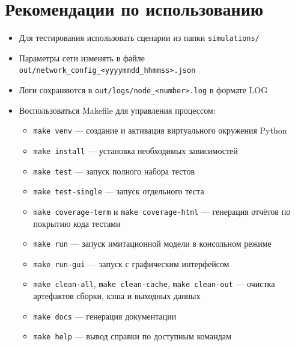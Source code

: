 \section{Рекомендации по использованию}

\begin{itemize}
    \item Для тестирования использовать сценарии из папки \texttt{simulations/}
    \item Параметры сети изменять в файле \verb|out/network_config_<yyyymmdd_hhmmss>.json|
    \item Логи сохраняются в \verb|out/logs/node_<number>.log| в формате LOG
    \item Воспользоваться Makefile для управления процессом:
    \begin{itemize}
        \item \texttt{make venv} — создание и активация виртуального окружения Python
        \item \texttt{make install} — установка необходимых зависимостей
        \item \texttt{make test} — запуск полного набора тестов
        \item \texttt{make test-single} — запуск отдельного теста
        \item \texttt{make coverage-term} и \texttt{make coverage-html} — генерация отчётов по покрытию кода тестами
        \item \texttt{make run} — запуск имитационной модели в консольном режиме
        \item \texttt{make run-gui} — запуск с графическим интерфейсом
        \item \texttt{make clean-all}, \texttt{make clean-cache}, \texttt{make clean-out} — очистка артефактов сборки, кэша и выходных данных
        \item \texttt{make docs} — генерация документации
        \item \texttt{make help} — вывод справки по доступным командам
    \end{itemize}
\end{itemize}
